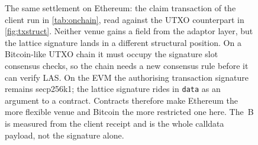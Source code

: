 \begin{figure}[tbp]
  \centering
  \caption[The claim transaction on the EVM]{The same settlement on Ethereum: the claim
  transaction of the client run in \cref{tab:onchain}, read against the UTXO counterpart
  in \cref{fig:txstruct}. Neither venue gains a field from the adaptor layer, but the
  lattice signature lands in a different structural position. On a Bitcoin-like UTXO
  chain it must occupy the signature slot consensus checks, so the chain needs a new
  consensus rule before it can verify LAS. On the EVM the authorising transaction
  signature remains secp256k1; the lattice signature rides in \texttt{data} as an
  argument to a contract. Contracts therefore make Ethereum the more flexible venue and
  Bitcoin the more restricted one here. The \gasOptCalldata\,B is measured from the
  client receipt and is the whole calldata payload, not the signature alone.}
  \label{fig:evmtx}
\end{figure}
\endgroup

